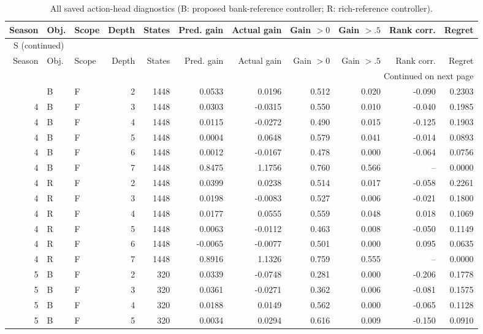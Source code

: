 \documentclass[10pt,a4paper]{article}
\renewcommand{\thetable}{S\arabic{table}}
\begin{document}
\begin{longtable}{rllrrrrrrrr}
\caption{All saved action-head diagnostics (B: proposed bank-reference controller; R: rich-reference controller).}\label{tab:action}\\
\toprule
Season & Obj. & Scope & Depth & States & Pred. gain & Actual gain & Gain $>0$ & Gain $>.5$ & Rank corr. & Regret \\
\midrule
\endfirsthead
\multicolumn{11}{l}{\tablename~\thetable{} (continued)}\\
\toprule
Season & Obj. & Scope & Depth & States & Pred. gain & Actual gain & Gain $>0$ & Gain $>.5$ & Rank corr. & Regret \\
\midrule
\endhead
\midrule
\multicolumn{11}{r}{Continued on next page}\\
\endfoot
\bottomrule
\endlastfoot
4 & B & F & 2 & 1448 & 0.0533 & 0.0196 & 0.512 & 0.020 & -0.090 & 0.2303 \\
4 & B & F & 3 & 1448 & 0.0303 & -0.0315 & 0.550 & 0.010 & -0.040 & 0.1985 \\
4 & B & F & 4 & 1448 & 0.0115 & -0.0272 & 0.490 & 0.015 & -0.125 & 0.1903 \\
4 & B & F & 5 & 1448 & 0.0004 & 0.0648 & 0.579 & 0.041 & -0.014 & 0.0893 \\
4 & B & F & 6 & 1448 & 0.0012 & -0.0167 & 0.478 & 0.000 & -0.064 & 0.0756 \\
4 & B & F & 7 & 1448 & 0.8475 & 1.1756 & 0.760 & 0.566 & -- & 0.0000 \\
4 & R & F & 2 & 1448 & 0.0399 & 0.0238 & 0.514 & 0.017 & -0.058 & 0.2261 \\
4 & R & F & 3 & 1448 & 0.0198 & -0.0083 & 0.527 & 0.006 & -0.021 & 0.1800 \\
4 & R & F & 4 & 1448 & 0.0177 & 0.0555 & 0.559 & 0.048 & 0.018 & 0.1069 \\
4 & R & F & 5 & 1448 & 0.0063 & -0.0112 & 0.463 & 0.008 & -0.050 & 0.1149 \\
4 & R & F & 6 & 1448 & -0.0065 & -0.0077 & 0.501 & 0.000 & 0.095 & 0.0635 \\
4 & R & F & 7 & 1448 & 0.8916 & 1.1326 & 0.759 & 0.555 & -- & 0.0000 \\
5 & B & F & 2 & 320 & 0.0339 & -0.0748 & 0.281 & 0.000 & -0.206 & 0.1778 \\
5 & B & F & 3 & 320 & 0.0361 & -0.0271 & 0.362 & 0.006 & -0.081 & 0.1575 \\
5 & B & F & 4 & 320 & 0.0188 & 0.0149 & 0.562 & 0.000 & -0.065 & 0.1128 \\
5 & B & F & 5 & 320 & 0.0034 & 0.0294 & 0.616 & 0.009 & -0.150 & 0.0910 \\

\end{longtable}
\end{document}
